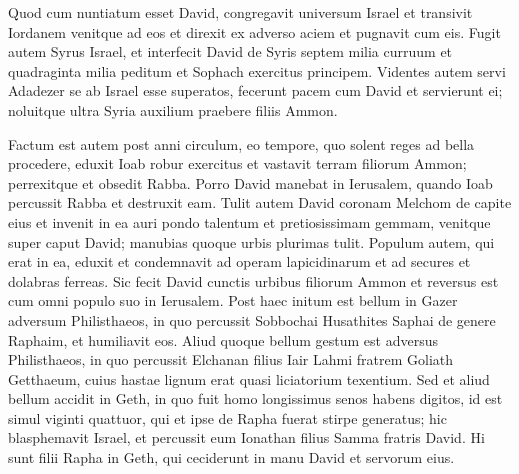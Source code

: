 \begin{biblechapter}
\begin{biblechapter}
\begin{biblechapter}
\begin{biblechapter}
\begin{biblechapter}
\begin{biblechapter}
\begin{biblechapter}
\begin{biblechapter}
\begin{biblechapter}
\begin{biblechapter}
\begin{biblechapter}
\begin{biblechapter}
\begin{biblechapter}
\begin{biblechapter}
\begin{biblechapter}
\begin{biblechapter}
\begin{biblechapter}
\begin{biblechapter}
\begin{biblechapter}
\verse Quod cum nuntiatum esset David, congregavit universum Israel et transivit Iordanem venitque ad eos et direxit ex adverso aciem et pugnavit cum eis. 
\verse Fugit autem Syrus Israel, et interfecit David de Syris septem milia curruum et quadraginta milia peditum et Sophach exercitus principem. 
\verse Videntes autem servi Adadezer se ab Israel esse superatos, fecerunt pacem cum David et servierunt ei; noluitque ultra Syria auxilium praebere filiis Ammon.
 
\begin{biblechapter}
\verse Factum est autem post anni circulum, eo tempore, quo solent reges ad bella procedere, eduxit Ioab robur exercitus et vastavit terram filiorum Ammon; perrexitque et obsedit Rabba. Porro David manebat in Ierusalem, quando Ioab percussit Rabba et destruxit eam. 
\verse Tulit autem David coronam Melchom de capite eius et invenit in ea auri pondo talentum et pretiosissimam gemmam, venitque super caput David; manubias quoque urbis plurimas tulit. 
\verse Populum autem, qui erat in ea, eduxit et condemnavit ad operam lapicidinarum et ad secures et dolabras ferreas. Sic fecit David cunctis urbibus filiorum Ammon et reversus est cum omni populo suo in Ierusalem.
 \verse Post haec initum est bellum in Gazer adversum Philisthaeos, in quo percussit Sobbochai Husathites Saphai de genere Raphaim, et humiliavit eos.
 \verse Aliud quoque bellum gestum est adversus Philisthaeos, in quo percussit Elchanan filius Iair Lahmi fratrem Goliath Getthaeum, cuius hastae lignum erat quasi liciatorium texentium.
 \verse Sed et aliud bellum accidit in Geth, in quo fuit homo longissimus senos habens digitos, id est simul viginti quattuor, qui et ipse de Rapha fuerat stirpe generatus; 
\verse hic blasphemavit Israel, et percussit eum Ionathan filius Samma fratris David. Hi sunt filii Rapha in Geth, qui ceciderunt in manu David et servorum eius.
 

\end{biblechapter}
\end{biblechapter}
\end{biblechapter}
\end{biblechapter}
\end{biblechapter}
\end{biblechapter}
\end{biblechapter}
\end{biblechapter}
\end{biblechapter}
\end{biblechapter}
\end{biblechapter}
\end{biblechapter}
\end{biblechapter}
\end{biblechapter}
\end{biblechapter}
\end{biblechapter}
\end{biblechapter}
\end{biblechapter}
\end{biblechapter}
\end{biblechapter}
